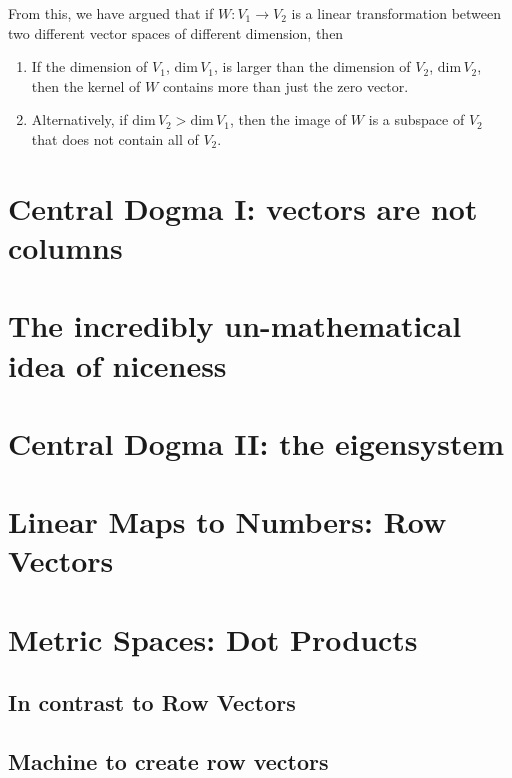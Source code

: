 \documentclass[12pt]{article}
\begin{document}
From this, we have argued that if $W: V_1 \to V_2$ is a linear transformation between two different vector spaces of different dimension, then 
\begin{enumerate}
    \item If the dimension of $V_1$, $\text{dim}\,V_1$, is larger than the dimension of $V_2$, $\text{dim}\,V_2$, then the kernel of $W$ contains more than just the zero vector.
    \item Alternatively, if $\text{dim}\,V_2 > \text{dim}\,V_1$, then the image of $W$ is a subspace of $V_2$ that does not contain all of $V_2$. 
\end{enumerate}



\section{Central Dogma I: vectors are not columns}


\section{The incredibly un-mathematical idea of niceness}


\section{Central Dogma II: the eigensystem}



\section{Linear Maps to Numbers: Row Vectors}

\section{Metric Spaces: Dot Products}



\subsection{In contrast to Row Vectors}
\subsection{Machine to create row vectors}
\end{document}
